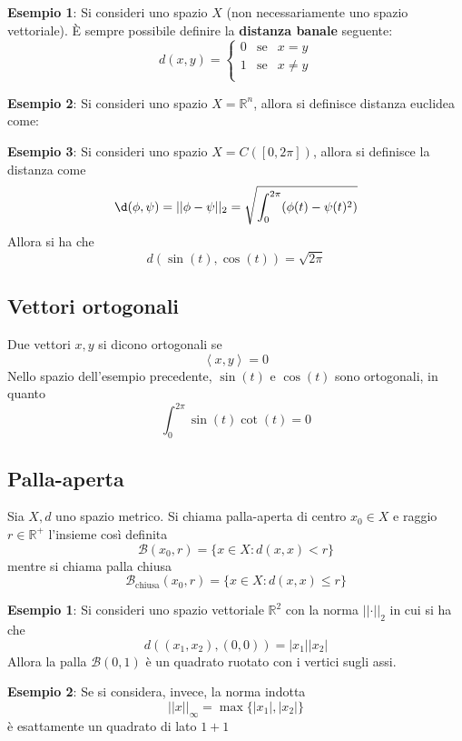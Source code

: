 \documentclass[a4paper]{extarticle}
\begin{document}
\vspace{2em}
\noindent
\textbf{Esempio 1}: Si consideri uno spazio $X$ (non necessariamente uno spazio vettoriale). È sempre possibile definire la \textbf{distanza banale} seguente:
\[
    d(x,y) = \left\{
        \begin{array}{lll}
            0 & \text{se} & x=y\\
            1 & \text{se} & x \neq y\\
        \end{array}
    \right.
\]

\vspace{1em}
\noindent
\textbf{Esempio 2}: Si consideri uno spazio $X=\mathbb{R}^n$, allora si definisce distanza euclidea come:

\vspace{1em}
\noindent
\textbf{Esempio 3}: Si consideri uno spazio $X=C([0,2 \pi])$, allora si definisce la distanza come
\[\d(\phi,\psi) = \vert \vert \phi-\psi \vert \vert_2 = \sqrt{\int_0^{2\pi} (\phi(t) - \psi(t)^2)}\]
Allora si ha che
\[d(\sin(t),\cos(t)) = \sqrt{2\pi}\]

\vspace{1em}
\subsection{Vettori ortogonali}
Due vettori $x,y$ si dicono ortogonali se
\[\left<x,y\right>=0\]
Nello spazio dell'esempio precedente, $\sin(t)$ e $\cos(t)$ sono ortogonali, in quanto
\[\int_0^{2\pi} \sin(t) \cot(t) = 0\]

\vspace{1em}
\subsection{Palla-aperta}
Sia $X,d$ uno spazio metrico. Si chiama palla-aperta di centro $x_0 \in X$ e raggio $r \in \mathbb{R}^+$ l'insieme così definita
\[\mathcal{B}(x_0,r) = \{x \in X : d(x,x) < r\}\]
mentre si chiama palla chiusa
\[\mathcal{B}_\text{chiusa}(x_0,r) = \{x \in X : d(x,x) \leq r\}\]

\vspace{1em}
\noindent
\textbf{Esempio 1}: Si consideri uno spazio vettoriale $\mathbb{R}^2$ con la norma $\vert \vert \cdot \vert \vert_2$ in cui si ha che
\[d \left((x_1,x_2),(0,0)\right) = \vert x_1 \vert \vert x_2 \vert\]
Allora la palla $\mathcal{B}(0,1)$ è un quadrato ruotato con i vertici sugli assi.

\vspace{1em}
\noindent
\textbf{Esempio 2}: Se si considera, invece, la norma indotta
\[\vert \vert x \vert \vert_\infty = \max\{\vert x_1 \vert, \vert x_2 \vert\}\]
è esattamente un quadrato di lato $1+1$ 
\end{document}
